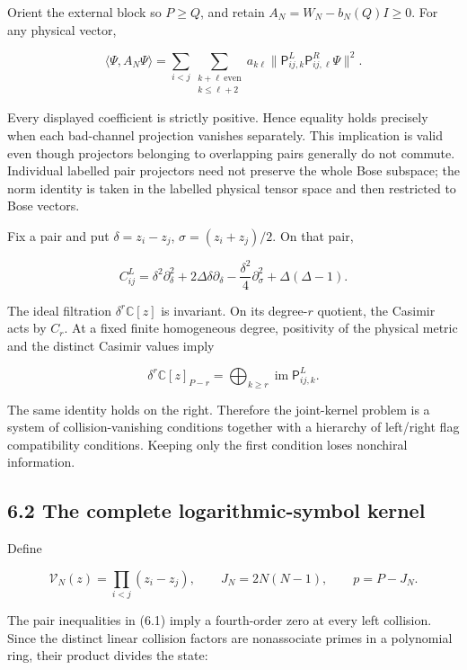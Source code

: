 \documentclass[a4paper,11pt]{article}
\numberwithin{equation}{section}
\begin{document}
Orient the external block so \(P\ge Q\), and retain \(A_N=W_N-b_N(Q)I\ge0\). For any physical vector,

\[
\langle\Psi,A_N\Psi\rangle
=\sum_{i<j}\sum_{\substack{k+\ell\ \mathrm{even}\\k\le\ell+2}}
a_{k\ell}\|\mathsf P^L_{ij,k}\mathsf P^R_{ij,\ell}\Psi\|^2.
\tag{6.1}
\]

Every displayed coefficient is strictly positive. Hence equality holds precisely when each bad-channel projection vanishes separately. This implication is valid even though projectors belonging to overlapping pairs generally do not commute. Individual labelled pair projectors need not preserve the whole Bose subspace; the norm identity is taken in the labelled physical tensor space and then restricted to Bose vectors.

Fix a pair and put \(\delta=z_i-z_j\), \(\sigma=(z_i+z_j)/2\). On that pair,

\[
C_{ij}^L=
\delta^2\partial_\delta^2+2\Delta\delta\partial_\delta
-\frac{\delta^2}{4}\partial_\sigma^2+\Delta(\Delta-1).
\tag{6.2}
\]

The ideal filtration \(\delta^r\mathbb C[z]\) is invariant. On its degree-\(r\) quotient, the Casimir acts by \(C_r\). At a fixed finite homogeneous degree, positivity of the physical metric and the distinct Casimir values imply

\[
\delta^r\mathbb C[z]_{P-r}
=\bigoplus_{k\ge r}\operatorname{im}\mathsf P^L_{ij,k}.
\tag{6.3}
\]

The same identity holds on the right. Therefore the joint-kernel problem is a system of collision-vanishing conditions together with a hierarchy of left/right flag compatibility conditions. Keeping only the first condition loses nonchiral information.

\hypertarget{the-complete-logarithmic-symbol-kernel}{%
\subsection{6.2 The complete logarithmic-symbol kernel}\label{the-complete-logarithmic-symbol-kernel}}

Define

\[
\mathcal V_N(z)=\prod_{i<j}(z_i-z_j),\qquad
J_N=2N(N-1),\qquad p=P-J_N.
\tag{6.4}
\]

The pair inequalities in (6.1) imply a fourth-order zero at every left collision. Since the distinct linear collision factors are nonassociate primes in a polynomial ring, their product divides the state:
\end{document}
